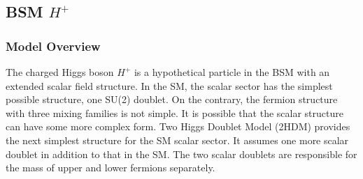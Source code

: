 








\subsection{BSM $H^+$}
\label{sec:relatedWorks:bsm:chargedHiggs}

\subsubsection{Model Overview}
The charged Higgs boson $H^+$ is a hypothetical particle in the BSM with an extended scalar field structure. In the SM, the scalar sector has the simplest possible structure, one SU(2) doublet. On the contrary, the fermion structure with three mixing families is not simple. It is possible that the scalar structure can have some more complex form. Two Higgs Doublet Model (2HDM) provides the next simplest structure for the SM scalar sector. It assumes one more scalar doublet in addition to that in the SM. The two scalar doublets are responsible for the mass of upper and lower fermions separately. 

